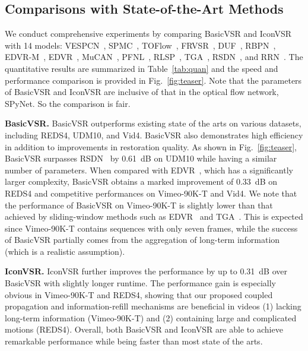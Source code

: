 \documentclass[final]{cvpr}
\begin{document}
\subsection{Comparisons with State-of-the-Art Methods}
We conduct comprehensive experiments by comparing \mbox{BasicVSR} and \mbox{IconVSR} with 14 models: VESPCN~\cite{caballero2017real}, SPMC~\cite{tao2017detail}, TOFlow~\cite{xue2019video}, FRVSR~\cite{sajjadi2018frame}, DUF~\cite{jo2018deep}, RBPN~\cite{haris2019recurrent}, EDVR-M~\cite{wang2019edvr}, EDVR~\cite{wang2019edvr}, MuCAN~\cite{li2020mucan}, PFNL~\cite{yi2019progressive}, RLSP~\cite{fuoli2019efficient}, TGA~\cite{isobe2020video}, RSDN~\cite{isobe2020video1}, and RRN~\cite{isobe2020revisiting}. The quantitative results are summarized in Table~\ref{tab:quan} and the speed and performance comparison is provided in Fig.~\ref{fig:teaser}. Note that the parameters of \mbox{BasicVSR} and IconVSR are inclusive of that in the optical flow network, SPyNet. So the comparison is fair.

\vspace{0.15cm}
\noindent\textbf{\mbox{BasicVSR}.} \mbox{BasicVSR} outperforms existing state of the arts on various datasets, including REDS4, UDM10, and Vid4.
\mbox{BasicVSR} also demonstrates high efficiency in addition to improvements in restoration quality. As shown in Fig.~\ref{fig:teaser}, \mbox{BasicVSR} surpasses RSDN~\cite{isobe2020video1} by 0.61~dB on UDM10 while having a similar number of parameters.
When compared with EDVR~\cite{wang2019edvr}, which has a significantly larger complexity, \mbox{BasicVSR} obtains a marked improvement of 0.33~dB on REDS4 and competitive performances on Vimeo-90K-T and Vid4.
We note that the performance of \mbox{BasicVSR} on Vimeo-90K-T is slightly lower than that achieved by sliding-window methods such as EDVR~\cite{wang2019edvr} and TGA~\cite{isobe2020video}. This is expected since Vimeo-90K-T contains sequences with only seven frames, while the success of \mbox{BasicVSR} partially comes from the aggregation of long-term information (which is a realistic assumption).


\noindent\textbf{\mbox{IconVSR}.} \mbox{IconVSR} further improves the performance by up to 0.31~dB over \mbox{BasicVSR} with slightly longer runtime. The performance gain is especially obvious in Vimeo-90K-T and REDS4, showing that our proposed coupled propagation and information-refill mechanisms are beneficial in videos (1) lacking long-term information (Vimeo-90K-T) and (2) containing large and complicated motions (REDS4).
Overall, both \mbox{BasicVSR} and \mbox{IconVSR} are able to achieve remarkable performance while being faster than most state of the arts.
\end{document}
